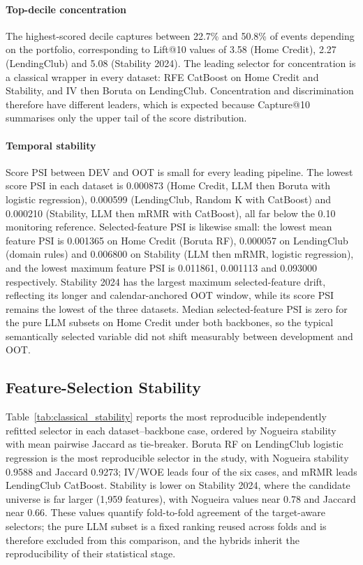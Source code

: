 \documentclass[preprint,12pt]{elsarticle}
\begin{document}
\paragraph{Top-decile concentration}
The highest-scored decile captures between 22.7\% and 50.8\% of events depending on the portfolio, corresponding to Lift@10 values of 3.58 (Home Credit), 2.27 (LendingClub) and 5.08 (Stability 2024). The leading selector for concentration is a classical wrapper in every dataset: RFE CatBoost on Home Credit and Stability, and IV then Boruta on LendingClub. Concentration and discrimination therefore have different leaders, which is expected because Capture@10 summarises only the upper tail of the score distribution.

\paragraph{Temporal stability}
Score PSI between DEV and OOT is small for every leading pipeline. The lowest score PSI in each dataset is 0.000873 (Home Credit, LLM then Boruta with logistic regression), 0.000599 (LendingClub, Random K with CatBoost) and 0.000210 (Stability, LLM then mRMR with CatBoost), all far below the 0.10 monitoring reference. Selected-feature PSI is likewise small: the lowest mean feature PSI is 0.001365 on Home Credit (Boruta RF), 0.000057 on LendingClub (domain rules) and 0.006800 on Stability (LLM then mRMR, logistic regression), and the lowest maximum feature PSI is 0.011861, 0.001113 and 0.093000 respectively. Stability 2024 has the largest maximum selected-feature drift, reflecting its longer and calendar-anchored OOT window, while its score PSI remains the lowest of the three datasets. Median selected-feature PSI is zero for the pure LLM subsets on Home Credit under both backbones, so the typical semantically selected variable did not shift measurably between development and OOT.

\subsection{Feature-Selection Stability}
\label{subsec:stability_results}

Table~\ref{tab:classical_stability} reports the most reproducible independently refitted selector in each dataset--backbone case, ordered by Nogueira stability with mean pairwise Jaccard as tie-breaker. Boruta RF on LendingClub logistic regression is the most reproducible selector in the study, with Nogueira stability 0.9588 and Jaccard 0.9273; IV/WOE leads four of the six cases, and mRMR leads LendingClub CatBoost. Stability is lower on Stability 2024, where the candidate universe is far larger (1,959 features), with Nogueira values near 0.78 and Jaccard near 0.66. These values quantify fold-to-fold agreement of the target-aware selectors; the pure LLM subset is a fixed ranking reused across folds and is therefore excluded from this comparison, and the hybrids inherit the reproducibility of their statistical stage.
\end{document}
